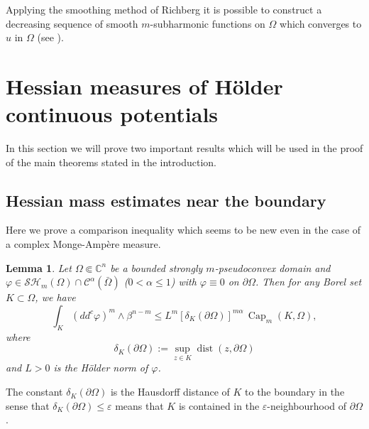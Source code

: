 \documentclass[JEP,XML,SOM,Unicode]{cedram}
\DeclareMathOperator{\dist}{dist}
\newtheorem{lemma}[theorem]{Lemma}
\theoremstyle{definition}
\renewcommand{\C}{\mathbb{C}}
\newcommand{\Cc}{\mathcal{C}}
\DeclareMathOperator{\Capa}{Cap}
\begin{document}
Applying the smoothing method of Richberg it is possible to construct a decreasing sequence of smooth $m$-subharmonic functions on $\Omega$ which converges to $u$ in $ \Omega$ (see \cite{P14}).

\section{Hessian measures of Hölder continuous potentials}\label{sec:4}

In this section we will prove two important results which will be used in the proof of the main theorems stated in the introduction.

\subsection{Hessian mass estimates near the boundary}

Here we prove a comparison inequality which seems to be new even in the case of a complex Monge-Ampère measure.

\begin{lemma} \label{lem:ComparisonIneq}
Let $\Omega \Subset \C^n$ be a bounded strongly $m$-pseudoconvex domain and $\varphi \in \mathcal{SH}_m(\Omega)\cap \Cc^{\alpha} (\bar{\Omega})$ ($0 < \alpha \leq 1$) with $\varphi \equiv 0$ on $\partial \Omega$. Then for any Borel set $K \subset \Omega$, we have
\[
\int_K (dd^c\varphi)^m\wedge\beta^{n-m} \leq L^m \left[\delta_K (\partial \Omega)\right]^{ m \alpha} \, \Capa_m (K,\Omega),
\]
where
\[
\delta_K (\partial \Omega):= \sup_{z \in K} \dist (z, \partial \Omega)
\]
and $L > 0$ is the Hölder norm of $\varphi$.
\end{lemma}
The constant $\delta_K (\partial \Omega)$ is the Hausdorff distance of $K$ to the boundary in the sense that $\delta_K (\partial \Omega) \leq \varepsilon $ means that $K$ is contained in the $\varepsilon$-neighbourhood of $\partial \Omega$.
\end{document}

